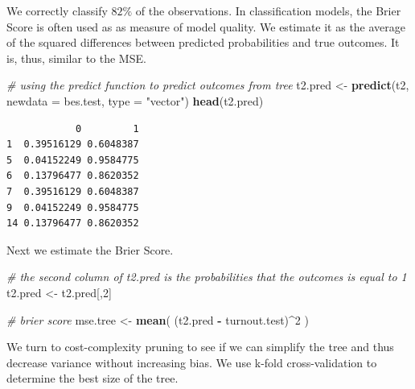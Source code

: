 \documentclass[]{article}
\newenvironment{Shaded}{\begin{snugshade}}{\end{snugshade}}
\newcommand{\CommentTok}[1]{\textcolor[rgb]{0.56,0.35,0.01}{\textit{#1}}}
\newcommand{\DataTypeTok}[1]{\textcolor[rgb]{0.13,0.29,0.53}{#1}}
\newcommand{\DecValTok}[1]{\textcolor[rgb]{0.00,0.00,0.81}{#1}}
\newcommand{\KeywordTok}[1]{\textcolor[rgb]{0.13,0.29,0.53}{\textbf{#1}}}
\newcommand{\NormalTok}[1]{#1}
\newcommand{\OperatorTok}[1]{\textcolor[rgb]{0.81,0.36,0.00}{\textbf{#1}}}
\newcommand{\StringTok}[1]{\textcolor[rgb]{0.31,0.60,0.02}{#1}}
\begin{document}
We correctly classify \(82\%\) of the observations. In classification models, the Brier Score is often used as as measure of model quality. We estimate it as the average of the squared differences between predicted probabilities and true outcomes. It is, thus, similar to the MSE.

\begin{Shaded}
\begin{Highlighting}[]
\CommentTok{# using the predict function to predict outcomes from tree}
\NormalTok{t2.pred <-}\StringTok{ }\KeywordTok{predict}\NormalTok{(t2, }\DataTypeTok{newdata =}\NormalTok{ bes.test, }\DataTypeTok{type =} \StringTok{"vector"}\NormalTok{)}
\KeywordTok{head}\NormalTok{(t2.pred)}
\end{Highlighting}
\end{Shaded}

\begin{verbatim}
            0         1
1  0.39516129 0.6048387
5  0.04152249 0.9584775
6  0.13796477 0.8620352
7  0.39516129 0.6048387
9  0.04152249 0.9584775
14 0.13796477 0.8620352
\end{verbatim}

Next we estimate the Brier Score.

\begin{Shaded}
\begin{Highlighting}[]
\CommentTok{# the second column of t2.pred is the probabilities that the outcomes is equal to 1}
\NormalTok{t2.pred <-}\StringTok{ }\NormalTok{t2.pred[,}\DecValTok{2}\NormalTok{]}

\CommentTok{# brier score}
\NormalTok{mse.tree <-}\StringTok{ }\KeywordTok{mean}\NormalTok{( (t2.pred }\OperatorTok{-}\StringTok{ }\NormalTok{turnout.test)}\OperatorTok{^}\DecValTok{2}\NormalTok{ )}
\end{Highlighting}
\end{Shaded}

We turn to cost-complexity pruning to see if we can simplify the tree and thus decrease variance without increasing bias. We use k-fold cross-validation to determine the best size of the tree.

\begin{Shaded}
\end{Shaded}
\end{document}
